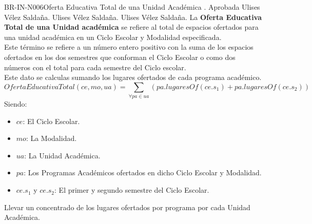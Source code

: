 \begin{BusinessRule}{BR-IN-N006}{Oferta Educativa Total de una Unidad Académica}
	{\bcDerivation}    %
	{\btEnabler}     %
	{\blControlling}    %
	.
	\BRItem[Estado] Aprobada
	 Ulises Vélez Saldaña.
	 Ulises Vélez Saldaña.
	 Ulises Vélez Saldaña.
	\BRItem[Descripción] La {\bf Oferta Educativa Total de una Unidad académica} se refiere al total de espacios ofertados para una unidad académica en un Ciclo Escolar y Modalidad especificada.\\ 
	Este término se refiere a un número entero positivo con la suma de los espacios ofertados en los dos semestres que conforman el Ciclo Escolar o como dos números con el total para cada semestre del Ciclo escolar.\\
	 Este dato se calculas sumando los lugares ofertados de cada programa académico.
	\BRItem[Sentencia] 
	\[OfertaEducativaTotal(ce, mo, ua) = \sum_{\forall pa \in ua}\left(pa.lugaresOf(ce.s_{1})+pa.lugaresOf(ce.s_{2})\right)\]
	Siendo:	
        \begin{itemize}
			\item $ce$: El Ciclo Escolar.
			\item $mo$: La Modalidad.
        	\item $ua$: La Unidad Académica.
			\item $pa$: Los Programas Académicos ofertados en dicho Ciclo Escolar y Modalidad.
			\item $ce.s_{1}$ y $ce.s_{2}$: El primer y segundo semestre del Ciclo Escolar.
        \end{itemize}
	\BRItem[Motivación] Llevar un concentrado de los lugares ofertados por programa por cada Unidad Académica.
\end{BusinessRule}


